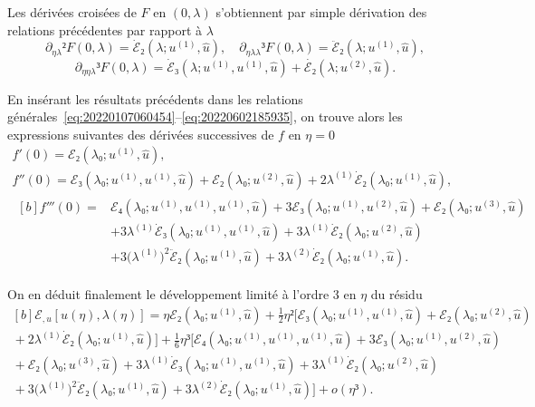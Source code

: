 \documentclass[12pt, final]{scrartcl}
\theoremstyle{definition}
\newcommand{\order}[2][1]{#2^{(#1)}}
\begin{document}
Les dérivées croisées de \(F\) en \((0, λ)\) s'obtiennent par simple dérivation
des relations précédentes par rapport à \(λ\)
\[∂_{ηλ}² F(0, λ) = \dot{ℰ}₂(λ; \order[1]u, \hat{u}), \quad ∂_{ηλλ}³ F(0, λ) = \ddot{ℰ}₂(λ; \order[1]u, \hat{u}),\]
\[∂_{ηηλ}³ F(0, λ) = \dot{ℰ}₃(λ; \order[1]u, \order[1]u, \hat{u}) + \dot{ℰ₂}(λ; \order[2]u, \hat{u}).\]

En insérant les résultats précédents dans les relations
générales~\eqref{eq:20220107060454}--\eqref{eq:20220602185935}, on trouve alors
les expressions suivantes des dérivées successives de \(f\) en \(η = 0\)
\begin{gather*}
  f'(0) = ℰ₂(λ₀; \order[1]u, \hat{u}),\\
  f''(0) = ℰ₃(λ₀; \order[1]u, \order[1]u, \hat{u}) + ℰ₂(λ₀; \order[2]u, \hat{u}) + 2 \order[1]λ \dot{ℰ}₂(λ₀; \order[1]u, \hat{u}),\\
  \begin{aligned}[b]
    f'''(0) ={}
    & ℰ₄(λ₀; \order[1]u, \order[1]u, \order[1]u, \hat{u}) + 3ℰ₃(λ₀; \order[1]u, \order[2]u, \hat{u}) + ℰ₂(λ₀ ; \order[3]u, \hat{u})\\
    & + 3\order[1]λ \dot{ℰ}₃(λ₀; \order[1]u, \order[1]u, \hat{u}) + 3\order[1]λ \dot{ℰ}₂(λ₀; \order[2]u, \hat{u})\\
    & + 3 \bigl( \order[1]λ \bigr)^2 \ddot{ℰ}₂(λ₀; \order[1]u, \hat{u}) + 3 \order[2]λ \dot{ℰ}₂(λ₀; \order[1]u, \hat{u}).
  \end{aligned}
\end{gather*}

On en déduit finalement le développement limité à l'ordre 3 en \(η\) du résidu
\begin{equation}
  \label{eq:20220107080901}
  \begin{gathered}[b]
    ℰ_{, u}[u(η), λ(η)] ={} η ℰ₂(λ₀; \order[1]u, \hat{u}) + \tfrac{1}{2} η² \bigl[ℰ₃(λ₀; \order[1]u, \order[1]u, \hat{u})  + ℰ₂(λ₀; \order[2]u, \hat{u})\\
    {} + 2 \order[1]λ \dot{ℰ}₂(λ₀; \order[1]u, \hat{u})\bigr] + \tfrac{1}{6} η³ \bigl[ ℰ₄(λ₀; \order[1]u, \order[1]u, \order[1]u, \hat{u}) + 3ℰ₃(λ₀; \order[1]u, \order[2]u, \hat{u})\\
    {} + ℰ₂(λ₀; \order[3]u, \hat{u}) + 3\order[1]λ \dot{ℰ}₃(λ₀; \order[1]u, \order[1]u, \hat{u}) + 3\order[1]λ \dot{ℰ}₂(λ₀; \order[2]u, \hat{u})\\
    {} + 3 \bigl( \order[1]λ \bigr)^2 \ddot{ℰ}₂(λ₀; \order[1]u, \hat{u}) + 3 \order[2]λ \dot{ℰ}₂(λ₀ ; \order[1]u, \hat{u}) \bigr] + o(η³).
  \end{gathered}
\end{equation}
\end{document}
